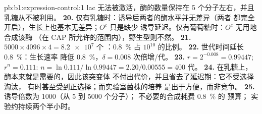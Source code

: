 \begin{solution}{pb:b1:expression-control:1}
lac 无法被激活，酶的数量保持在 5 个分子左右，并且
乳糖从不被利用。
\textbf{20.} 仅有乳糖时：诱导后两者的酶水平并无差异（两者
都完全开启），生长上也基本无差异；$O^c$ 只是缺少
诱导延迟。仅有葡萄糖时：$O^c$ 无用地合成该酶
（在 CAP 所允许的范围内），野生型则不然。
\textbf{21.} $5000\times 4096\times 4 = \num{8.2e7}$ 个 ：\qty{0.8}{\%}
占 $10^{10}$ 的比例。
\textbf{22.} 世代时间延长 \qty{0.8}{\%}：生长速率
降低 \qty{0.8}{\%}，$\delta = 0.008$ 次倍增/代。
\textbf{23.} $r = 2^{-0.008} = 0.99447$; $r^n = 0.111$: $n =
\ln 0.111/\ln 0.99447 = 2.20/0.00555 = 400$ 代。
\textbf{24.} 在乳糖上，酶本来就是需要的，因此该突变体
不付出代价，并且省去了延迟期：它不受选择淘汰，
有时甚至受到正选择；而实验室菌株的培养
是出于方便，而非竞争。
\textbf{25.} 诱导倍数为 1000（从 5 到 \num{5000} 个分子）；
不必要的合成耗费 \qty{0.8}{\%} 的  预算；
实验约持续两个半小时。
\end{solution}
